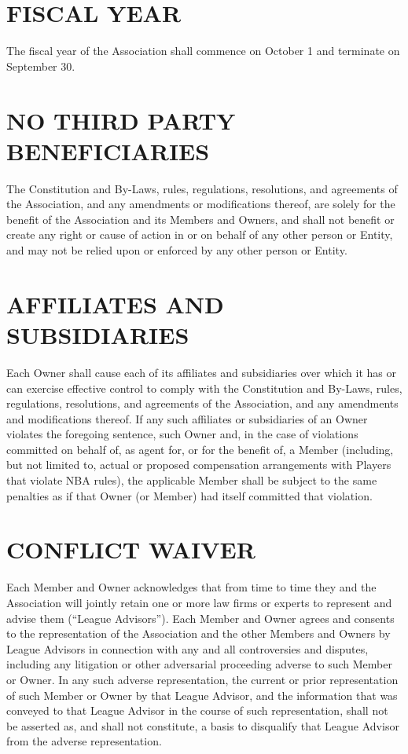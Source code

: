 \documentclass[]{book}
\theoremstyle{definition}
\theoremstyle{definition}
\theoremstyle{definition}
\theoremstyle{remark}
\begin{document}
\section{FISCAL YEAR}\label{fiscal-year}

The fiscal year of the Association shall commence on October 1 and
terminate on September 30.

\section{NO THIRD PARTY
BENEFICIARIES}\label{no-third-party-beneficiaries}

The Constitution and By-Laws, rules, regulations, resolutions, and
agreements of the Association, and any amendments or modifications
thereof, are solely for the benefit of the Association and its Members
and Owners, and shall not benefit or create any right or cause of action
in or on behalf of any other person or Entity, and may not be relied
upon or enforced by any other person or Entity.

\section{AFFILIATES AND SUBSIDIARIES}\label{affiliates-and-subsidiaries}

Each Owner shall cause each of its affiliates and subsidiaries over
which it has or can exercise effective control to comply with the
Constitution and By-Laws, rules, regulations, resolutions, and
agreements of the Association, and any amendments and modifications
thereof. If any such affiliates or subsidiaries of an Owner violates the
foregoing sentence, such Owner and, in the case of violations committed
on behalf of, as agent for, or for the benefit of, a Member (including,
but not limited to, actual or proposed compensation arrangements with
Players that violate NBA rules), the applicable Member shall be subject
to the same penalties as if that Owner (or Member) had itself committed
that violation.

\section{CONFLICT WAIVER}\label{conflict-waiver}

Each Member and Owner acknowledges that from time to time they and the
Association will jointly retain one or more law firms or experts to
represent and advise them (``League Advisors''). Each Member and Owner
agrees and consents to the representation of the Association and the
other Members and Owners by League Advisors in connection with any and
all controversies and disputes, including any litigation or other
adversarial proceeding adverse to such Member or Owner. In any such
adverse representation, the current or prior representation of such
Member or Owner by that League Advisor, and the information that was
conveyed to that League Advisor in the course of such representation,
shall not be asserted as, and shall not constitute, a basis to
disqualify that League Advisor from the adverse representation.
\end{document}
